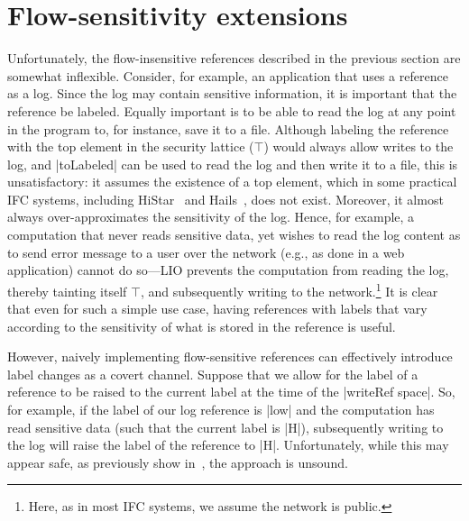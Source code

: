 \section{Flow-sensitivity extensions}
\label{sec:flow-sensitive}

Unfortunately, the flow-insensitive references described in the previous section
are somewhat inflexible.
%
Consider, for example, an application that uses a reference as a log.
%
Since the log may contain sensitive information, it is important that the
reference be labeled.
%
Equally important is to be able to read the log at any point in the program to,
for instance, save it to a file.
%
Although labeling the reference with the top element in the security
lattice ($\top$) would always allow writes to the log, and |toLabeled|
can be used to read the log and then write it to a file, this is
unsatisfactory: it assumes the existence of a top element, which in
some practical IFC systems, including HiStar~\cite{zeldovich:histar}
and Hails~\cite{giffin:hails}, does not exist.
%
Moreover, it almost always over-approximates the sensitivity of the
log.
%
Hence, for example, a computation that never reads sensitive data, yet
wishes to read the log content as to send error message to a user over
the network (e.g., as done in a web application) cannot do so---LIO
prevents the computation from reading the log, thereby tainting itself
$\top$, and subsequently writing to the network.\footnote{
  Here, as in most IFC systems, we assume the network is public.
}
%
It is clear that even for such a simple use case, having references
with labels that vary according to the sensitivity of what is stored
in the reference is useful.

However, naively implementing flow-sensitive references can effectively
introduce label changes as a covert channel. 
%
Suppose that we allow for the label of a reference to be raised to the
current label at the time of the |writeRef space|.
%
So, for example, if the label of our log reference is |low| and the
computation has read sensitive data (such that the current label is
|H|), subsequently writing to the log will raise the label of the
reference to |H|.
%
Unfortunately, while this may appear safe, as previously show
in~\cite{Austin:Flanagan:PLAS09,Russo:2010, Austin:Flanagan:PLAS10},
the approach is unsound.

